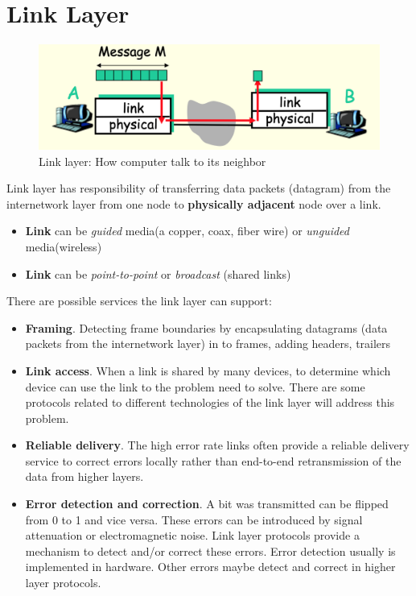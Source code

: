 \documentclass[a4paper, 11pt]{article}
\begin{document}
\clearpage
\section{Link Layer}

\begin{figure}[h]
\includegraphics[scale=0.5]{link-layer.png}
\caption{Link layer: How computer talk to its neighbor}
\end{figure}

Link layer has responsibility of transferring data packets (datagram) from the internetwork layer from one node to \textbf{physically adjacent} node over a link. \\

\begin{itemize}
\item \textbf{Link} can be \textit{guided} media(a copper, coax, fiber wire) or \textit{unguided} media(wireless)
\item \textbf{Link} can be \textit{point-to-point} or \textit{broadcast} (shared links)
\end{itemize}

There are possible services the link layer can support:\\

\begin{itemize}
\item \textbf{Framing}. Detecting frame boundaries by encapsulating datagrams (data packets from the internetwork layer) in to frames, adding headers, trailers
\item \textbf{Link access}. When a link is shared by many devices, to determine which device can use the link to the problem need to solve. There are some protocols related to different technologies of the link layer will address this problem.
\item \textbf{Reliable delivery}. The high error rate links often provide a reliable delivery service to correct errors locally rather than end-to-end retransmission of the data from higher layers.
\item \textbf{Error detection and correction}. A bit was transmitted can be flipped from 0 to 1 and vice versa. These errors can be introduced by signal attenuation or electromagnetic noise. Link layer protocols provide a mechanism to detect and/or correct these errors. Error detection usually is implemented in hardware. Other errors maybe detect and correct in higher layer protocols.
\end{itemize}
\end{document}
